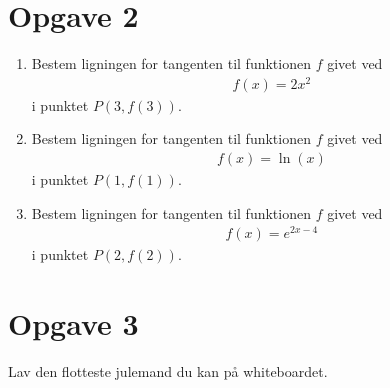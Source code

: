 \section*{Opgave 2}

\begin{enumerate}[label=\roman*)]
	\item Bestem ligningen for tangenten til funktionen $f$ givet ved
	\begin{align*}
		f(x) = 2x^2
	\end{align*}
	i punktet $P(3,f(3))$.
	\item Bestem ligningen for tangenten til funktionen $f$ givet ved
	\begin{align*}
		f(x) = \ln(x)
	\end{align*}
	i punktet $P(1,f(1))$.
	\item Bestem ligningen for tangenten til funktionen $f$ givet ved
	\begin{align*}
		f(x) = e^{2x-4}
	\end{align*}
	i punktet $P(2,f(2))$.
\end{enumerate}

\section*{Opgave 3}

Lav den flotteste julemand du kan på whiteboardet.

